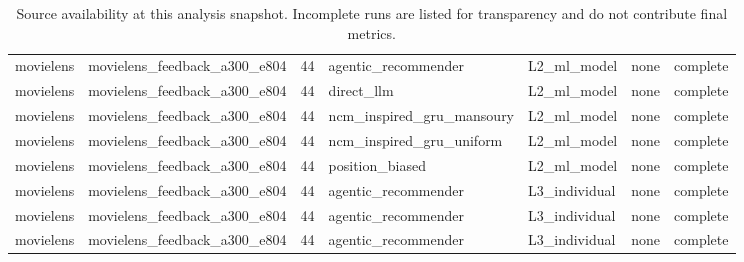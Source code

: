 \begin{table}[htbp!]
\begin{tabular}{llrllll}
movielens & movielens\_feedback\_a300\_e804 & 44 & agentic\_recommender & L2\_ml\_model & none & complete \\
movielens & movielens\_feedback\_a300\_e804 & 44 & direct\_llm & L2\_ml\_model & none & complete \\
movielens & movielens\_feedback\_a300\_e804 & 44 & ncm\_inspired\_gru\_mansoury & L2\_ml\_model & none & complete \\
movielens & movielens\_feedback\_a300\_e804 & 44 & ncm\_inspired\_gru\_uniform & L2\_ml\_model & none & complete \\
movielens & movielens\_feedback\_a300\_e804 & 44 & position\_biased & L2\_ml\_model & none & complete \\
movielens & movielens\_feedback\_a300\_e804 & 44 & agentic\_recommender & L3\_individual & none & complete \\
movielens & movielens\_feedback\_a300\_e804 & 44 & agentic\_recommender & L3\_individual & none & complete \\
movielens & movielens\_feedback\_a300\_e804 & 44 & agentic\_recommender & L3\_individual & none & complete \\
\hline
\end{tabular}
\caption{Source availability at this analysis snapshot. Incomplete runs are listed for transparency and do not contribute final metrics.}
\label{chap:results:tab:rq6_source_availability}
\end{table}
